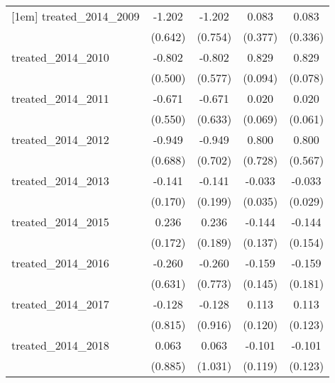 {\begin{tabular}{l*{4}{c}}
[1em]
treated\_2014\_2009&      -1.202         &      -1.202         &       0.083         &       0.083         \\
            &     (0.642)         &     (0.754)         &     (0.377)         &     (0.336)         \\
[1em]
treated\_2014\_2010&      -0.802         &      -0.802         &       0.829\sym{***}&       0.829\sym{***}\\
            &     (0.500)         &     (0.577)         &     (0.094)         &     (0.078)         \\
[1em]
treated\_2014\_2011&      -0.671         &      -0.671         &       0.020         &       0.020         \\
            &     (0.550)         &     (0.633)         &     (0.069)         &     (0.061)         \\
[1em]
treated\_2014\_2012&      -0.949         &      -0.949         &       0.800         &       0.800         \\
            &     (0.688)         &     (0.702)         &     (0.728)         &     (0.567)         \\
[1em]
treated\_2014\_2013&      -0.141         &      -0.141         &      -0.033         &      -0.033         \\
            &     (0.170)         &     (0.199)         &     (0.035)         &     (0.029)         \\
[1em]
treated\_2014\_2015&       0.236         &       0.236         &      -0.144         &      -0.144         \\
            &     (0.172)         &     (0.189)         &     (0.137)         &     (0.154)         \\
[1em]
treated\_2014\_2016&      -0.260         &      -0.260         &      -0.159         &      -0.159         \\
            &     (0.631)         &     (0.773)         &     (0.145)         &     (0.181)         \\
[1em]
treated\_2014\_2017&      -0.128         &      -0.128         &       0.113         &       0.113         \\
            &     (0.815)         &     (0.916)         &     (0.120)         &     (0.123)         \\
[1em]
treated\_2014\_2018&       0.063         &       0.063         &      -0.101         &      -0.101         \\
            &     (0.885)         &     (1.031)         &     (0.119)         &     (0.123)         \\

\end{tabular}}
